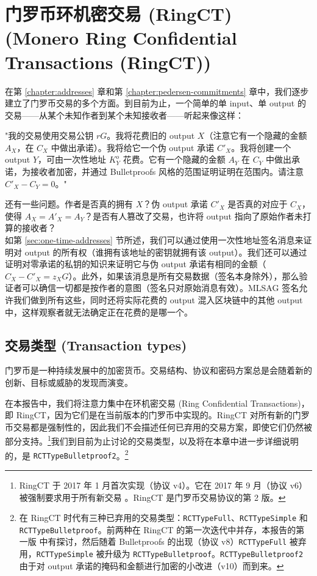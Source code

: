 \chapter{门罗币环机密交易 (RingCT) (Monero Ring Confidential Transactions (RingCT))}
\label{chapter:transactions}

在第 \ref{chapter:addresses} 章和第 \ref{chapter:pedersen-commitments} 章中，我们逐步建立了门罗币交易的多个方面。到目前为止，一个简单的单 input、单 output 的交易——从某个未知作者到某个未知接收者——听起来像这样：

"我的交易使用交易公钥 $r G$。我将花费旧的 output $X$（注意它有一个隐藏的金额 $A_X$，在 $C_X$ 中做出承诺）。我将给它一个伪 output 承诺 $C'_X$。我将创建一个 output $Y$，可由一次性地址 $K^o_Y$ 花费。它有一个隐藏的金额 $A_Y$ 在 $C_Y$ 中做出承诺，为接收者加密，并通过 Bulletproofs 风格的范围证明证明在范围内。请注意 $C'_X - C_Y = 0$。"

还有一些问题。作者是否真的拥有 $X$？伪 output 承诺 $C'_X$ 是否真的对应于 $C_X$，使得 $A_X = A'_X = A_Y$？是否有人篡改了交易，也许将 output 指向了原始作者未打算的接收者？\\

如第 \ref{sec:one-time-addresses} 节所述，我们可以通过使用一次性地址签名消息来证明对 output 的所有权（谁拥有该地址的密钥就拥有该 output）。我们还可以通过证明对零承诺的私钥的知识来证明它与伪 output 承诺有相同的金额（$C_X - C'_X = z_X G$）。此外，如果该消息是{所有交易数据}（签名本身除外），那么验证者可以确信一切都是按作者的意图（签名只对原始消息有效）。MLSAG 签名允许我们做到所有这些，同时还将实际花费的 output 混入区块链中的其他 output 中，这样观察者就无法确定正在花费的是哪一个。



\section{交易类型 (Transaction types)}
\label{sec:transaction_types}

门罗币是一种持续发展中的加密货币。交易结构、协议和密码方案总是会随着新的创新、目标或威胁的发现而演变。

在本报告中，我们将注意力集中在{环机密交易 (Ring Confidential Transactions)}，即 {RingCT}，因为它们是在当前版本的门罗币中实现的。RingCT 对所有新的门罗币交易都是强制性的，因此我们不会描述任何已弃用的交易方案，即使它们仍然被部分支持。\footnote{RingCT 于 2017 年 1 月首次实现（协议 v4）。它在 2017 年 9 月（协议 v6）被强制要求用于所有新交易 \cite{ringct-dates}。RingCT 是门罗币交易协议的第 2 版。}我们到目前为止讨论的交易类型，以及将在本章中进一步详细说明的，是 {\tt RCTTypeBulletproof2}。\footnote{在 RingCT 时代有三种已弃用的交易类型：{\tt RCTTypeFull}、{\tt RCTTypeSimple} 和 {\tt RCTTypeBulletproof}。前两种在 RingCT 的第一次迭代中并存，本报告的第一版 \cite{ztm-1} 中有探讨，然后随着 Bulletproofs 的出现（协议 v8）{\tt RCTTypeFull} 被弃用，{\tt RCTTypeSimple} 被升级为 {\tt RCTTypeBulletproof}。{\tt RCTTypeBulletproof2} 由于对 output 承诺的掩码和金额进行加密的小改进（v10）而到来。}

